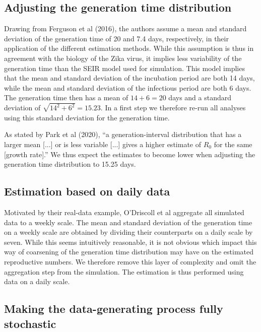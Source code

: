 \documentclass{article}
\begin{document}
\subsection{Adjusting the generation time distribution}

Drawing from Ferguson et al (2016), the authors assume a mean and standard deviation of the generation time of 20 and 7.4 days, respectively, in their application of the different estimation methods. While this assumption is thus in agreement with the biology of the Zika virus, it implies less variability of the generation time than the SEIR model used for simulation. This model implies that the mean and standard deviation of the incubation period are both 14 days, while the mean and standard deviation of the infectious period are both 6 days. The generation time then has a mean of $14 + 6 = 20$ days and a standard deviation of $\sqrt{14^2 + 6^2} = 15.23$. In a first step we therefore re-run all analyses using this standard deviation for the generation time.

As stated by Park et al (2020), ``a generation-interval distribution
that has a larger mean [...] or is less variable [...] gives
a higher estimate of $R_0$ for the same [growth rate].'' We thus expect the estimates to become lower when adjusting the generation time distribution to 15.25 days.



\subsection{Estimation based on daily data}

Motivated by their real-data example, O'Driscoll et al aggregate all simulated data to a weekly scale. The mean and standard deviation of the generation time on a weekly scale are obtained by dividing their counterparts on a daily scale by seven. While this seems intuitively reasonable, it is not obvious which impact this way of coarsening of the generation time distribution may have on the estimated reproductive numbers. We therefore remove this layer of complexity and omit the aggregation step from the simulation. The estimation is thus performed using data on a daily scale.


\subsection{Making the data-generating process fully stochastic}
\end{document}
